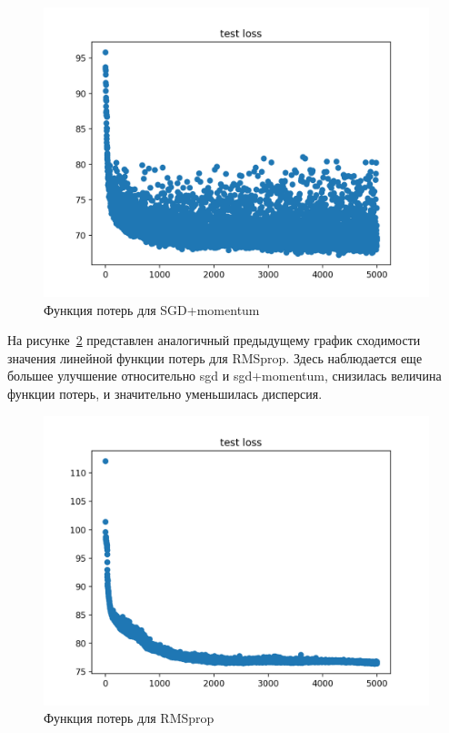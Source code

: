 \documentclass[oneside,final,12pt]{extreport}
\begin{document}
\begin{figure}[th]
\includegraphics[width=1.0\textwidth]{Figure_3}
\caption{Функция потерь для SGD+momentum}
\label{loss_figure2}
\end{figure}


На рисунке \,\ref{loss_figure3} представлен аналогичный предыдущему график сходимости значения линейной функции потерь для RMSprop. Здесь наблюдается еще большее улучшение относительно sgd и sgd+momentum, снизилась величина функции потерь, и значительно уменьшилась дисперсия.


\begin{figure}[th]
\includegraphics[width=1.0\textwidth]{Figure_6}
\caption{Функция потерь для RMSprop}
\label{loss_figure3}
\end{figure}
\end{document}
